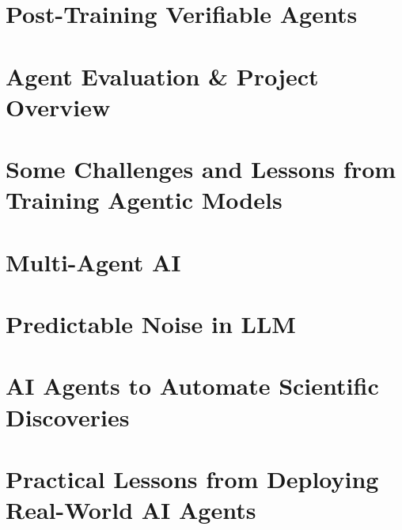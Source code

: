 \documentclass[a4paper]{article}
\begin{document}
\section{Post-Training Verifiable Agents}


\section{Agent Evaluation \& Project Overview}


\section{Some Challenges and Lessons from Training Agentic Models}


\section{Multi-Agent AI}


\section{Predictable Noise in LLM}


\section{AI Agents to Automate Scientific Discoveries}


\section{Practical Lessons from Deploying Real-World AI Agents}

\end{document}
